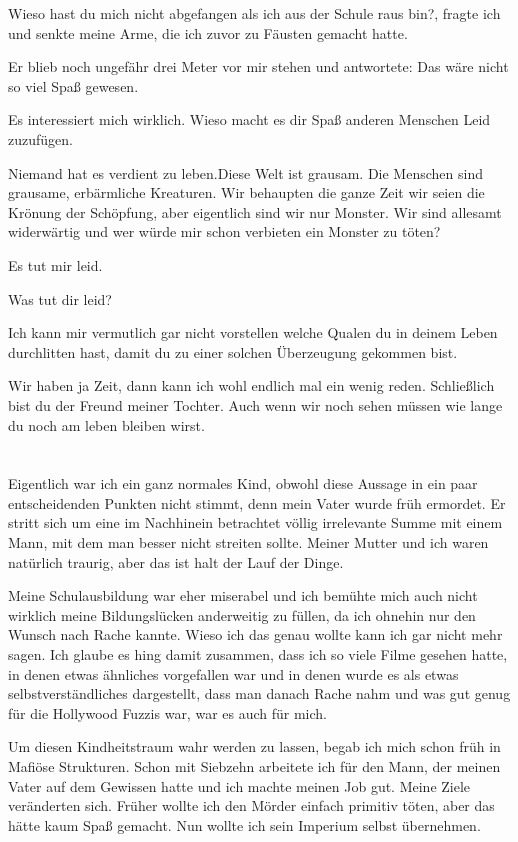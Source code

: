 \documentclass[11pt, a5paper]{article}
\newcommand{\nL}{Niemand hat es verdient zu leben.}
\begin{document}
\begin{spacing}{1.2}
		\frqq Wieso hast du mich nicht abgefangen als ich aus der Schule raus bin?\flqq , fragte ich und senkte meine Arme, die ich zuvor zu Fäusten gemacht hatte.
		
		Er blieb noch ungefähr drei Meter vor mir stehen und antwortete: \frqq Das wäre nicht so viel Spaß gewesen.\flqq
		
		\frqq Es interessiert mich wirklich. Wieso macht es dir Spaß anderen Menschen Leid zuzufügen.\flqq
		
		\frqq \nL Diese Welt ist grausam. Die Menschen sind grausame, erbärmliche Kreaturen. Wir behaupten die ganze Zeit wir seien die Krönung der Schöpfung, aber eigentlich sind wir nur Monster. Wir sind allesamt widerwärtig und wer würde mir schon verbieten ein Monster zu töten?\flqq
		
		\frqq Es tut mir leid.\flqq
		
		\frqq Was tut dir leid?\flqq
		
		\frqq Ich kann mir vermutlich gar nicht vorstellen welche Qualen du in deinem Leben durchlitten hast, damit du zu einer solchen Überzeugung gekommen bist.\flqq
		
		\frqq Wir haben ja Zeit, dann kann ich wohl endlich mal ein wenig reden. Schließlich bist du der Freund meiner Tochter. Auch wenn wir noch sehen müssen wie lange du noch am leben bleiben wirst.\flqq\newpage
		
		\section{}
		Eigentlich war ich ein ganz normales Kind, obwohl diese Aussage in ein paar entscheidenden Punkten nicht stimmt, denn mein Vater wurde früh ermordet. Er stritt sich um eine im Nachhinein betrachtet völlig irrelevante Summe mit einem Mann, mit dem man besser nicht streiten sollte. Meiner Mutter und ich waren natürlich traurig, aber das ist halt der Lauf der Dinge.
		
		Meine Schulausbildung war eher miserabel und ich bemühte mich auch nicht wirklich meine Bildungslücken anderweitig zu füllen, da ich ohnehin nur den Wunsch nach Rache kannte. Wieso ich das genau wollte kann ich gar nicht mehr sagen. Ich glaube es hing damit zusammen, dass ich so viele Filme gesehen hatte, in denen etwas ähnliches vorgefallen war und in denen wurde es als etwas selbstverständliches dargestellt, dass man danach Rache nahm und was gut genug für die Hollywood Fuzzis war, war es auch für mich.
		
		Um diesen Kindheitstraum wahr werden zu lassen, begab ich mich schon früh in Mafiöse Strukturen. Schon mit Siebzehn arbeitete ich für den Mann, der meinen Vater auf dem Gewissen hatte und ich machte meinen Job gut. Meine Ziele veränderten sich. Früher wollte ich den Mörder einfach primitiv töten, aber das hätte kaum Spaß gemacht. Nun wollte ich sein Imperium selbst übernehmen.
		

\end{spacing}
\end{document}
